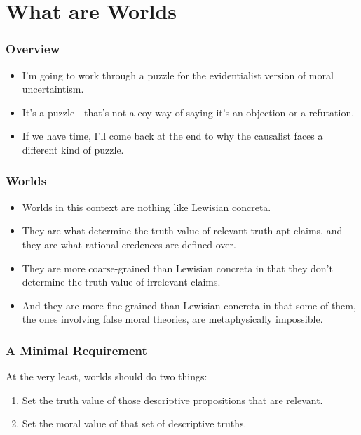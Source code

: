 \section{What are Worlds}
\label{whatareworlds}

\begin{frame}[fragile]
\frametitle{Overview}
\label{overview}

\begin{itemize}
\item{} I'm going to work through a puzzle for the evidentialist version of moral uncertaintism.

\item{} It's a puzzle - that's not a coy way of saying it's an objection or a refutation.

\item{} If we have time, I'll come back at the end to why the causalist faces a different kind of puzzle.

\end{itemize}

\end{frame}

\begin{frame}[fragile]
\frametitle{Worlds}
\label{worlds}

\begin{itemize}
\item{} Worlds in this context are nothing like Lewisian concreta.

\item{} They are what determine the truth value of relevant truth-apt claims, and they are what rational credences are defined over.

\item{} They are more coarse-grained than Lewisian concreta in that they don't determine the truth-value of irrelevant claims.

\item{} And they are more fine-grained than Lewisian concreta in that some of them, the ones involving false moral theories, are metaphysically impossible.

\end{itemize}

\end{frame}

\begin{frame}[fragile]
\frametitle{A Minimal Requirement}
\label{aminimalrequirement}

At the very least, worlds should do two things:

\begin{enumerate}
\item{} Set the truth value of those descriptive propositions that are relevant.

\item{} Set the moral value of that set of descriptive truths.

\end{enumerate}

\end{frame}

